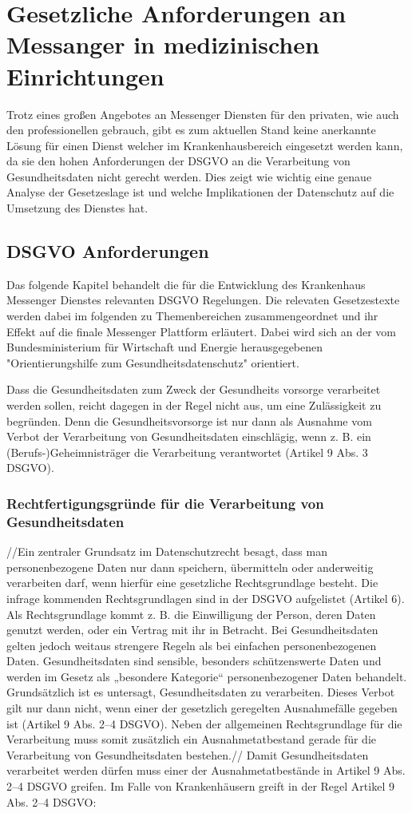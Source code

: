 \chapter{Gesetzliche Anforderungen an Messanger in medizinischen Einrichtungen}\label{chapter:ganforderungen}
Trotz eines großen Angebotes an Messenger Diensten für den privaten, wie auch den professionellen gebrauch, gibt es zum aktuellen Stand keine anerkannte Lösung für einen Dienst welcher im Krankenhausbereich eingesetzt werden kann, da sie den hohen Anforderungen der DSGVO an die Verarbeitung von Gesundheitsdaten nicht gerecht werden. Dies zeigt wie wichtig eine genaue Analyse der Gesetzeslage ist und welche Implikationen der Datenschutz auf die Umsetzung des Dienstes hat.

\section{DSGVO Anforderungen}\label{section:dsgvo}
Das folgende Kapitel behandelt die für die Entwicklung des Krankenhaus Messenger Dienstes relevanten DSGVO Regelungen. Die relevaten Gesetzestexte werden dabei im folgenden zu Themenbereichen zusammengeordnet und ihr Effekt auf die finale Messenger Plattform erläutert. Dabei wird sich an der vom Bundesministerium für Wirtschaft und Energie herausgegebenen "Orientierungshilfe zum Gesundheitsdatenschutz" orientiert.

Dass die Gesundheitsdaten zum Zweck der Gesundheits vorsorge verarbeitet werden sollen, reicht dagegen in der Regel nicht aus, um eine Zulässigkeit zu begründen. Denn die Gesundheitsvorsorge ist nur dann als Ausnahme vom Verbot der Verarbeitung von Gesundheitsdaten einschlägig, wenn z. B. ein (Berufs-)Geheimnisträger die Verarbeitung verantwortet (Artikel 9 Abs. 3 DSGVO).

\subsection{Rechtfertigungsgründe für die Verarbeitung von Gesundheitsdaten}\label{subsection:rfdvvg}
//Ein zentraler Grundsatz im Datenschutzrecht besagt, dass man personenbezogene Daten nur dann speichern, übermitteln oder anderweitig verarbeiten darf, wenn hierfür eine gesetzliche Rechtsgrundlage besteht. Die infrage kommenden Rechtsgrundlagen sind in der DSGVO aufgelistet (Artikel 6). Als Rechtsgrundlage kommt z. B. die Einwilligung der Person, deren Daten genutzt werden, oder ein Vertrag mit ihr in Betracht.
Bei Gesundheitsdaten gelten jedoch weitaus strengere Regeln als bei einfachen personenbezogenen Daten. Gesundheitsdaten sind sensible, besonders schützenswerte Daten und werden im Gesetz als „besondere Kategorie“ personenbezogener Daten behandelt. Grundsätzlich ist es untersagt, Gesundheitsdaten zu verarbeiten. Dieses Verbot gilt nur dann nicht, wenn einer der gesetzlich geregelten Ausnahmefälle gegeben ist (Artikel 9 Abs. 2–4 DSGVO).
Neben der allgemeinen Rechtsgrundlage für die Verarbeitung muss somit zusätzlich ein Ausnahmetatbestand gerade für die Verarbeitung von Gesundheitsdaten bestehen.//
Damit Gesundheitsdaten verarbeitet werden dürfen muss einer der Ausnahmetatbestände in Artikel 9 Abs. 2–4 DSGVO greifen. Im Falle von Krankenhäusern greift in der Regel Artikel 9 Abs. 2–4 DSGVO: 

